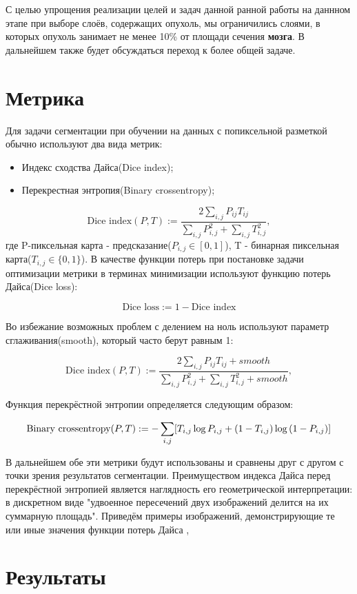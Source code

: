 С целью упрощения реализации целей и задач данной ранной работы на даннном этапе при выборе слоёв, содержащих опухоль, мы ограничились слоями, в которых опухоль занимает не менее 10\% от площади сечения {\bf мозга}. В дальнейшем также будет обсуждаться переход к более общей задаче.
\section{Метрика}

Для задачи сегментации при обучении на данных с попиксельной разметкой обычно используют два вида метрик:
\begin{itemize}
    \item Индекс сходства Дайса(Dice index);
    \item Перекрестная энтропия(Binary crossentropy);
\end{itemize}

$$\text{Dice~index}(P,T) := \frac{2\sum_{i,j}P_{ij}T_{ij}}{\sum_{i,j}P^2_{i,j} + \sum_{i,j}T^2_{i,j}},$$
где P-пиксельная карта - предсказание($P_{i,j}\in [0,1]$), T - бинарная пиксельная карта($T_{i,j}\in\{0,1\}$). В качестве функции потерь при постановке задачи оптимизации метрики в терминах минимизации используют функцию потерь Дайса(Dice loss):

$$\text{Dice~loss} := 1 - \text{Dice~index}$$

Во избежание возможных проблем с делением на ноль используют параметр сглаживания(smooth), который часто берут равным 1:

$$\text{Dice~index}(P,T) := \frac{2\sum_{i,j}P_{ij}T_{ij} + smooth}{\sum_{i,j}P^2_{i,j} + \sum_{i,j}T^2_{i,j} + smooth},$$

Функция перекрёстной энтропии определяется следующим образом:

$$\text{Binary~crossentropy}(P, T) := -\sum_{i,j}\Large[T_{i,j}\log{P_{i,j}} + (1-T_{i,j})\log{(1-P_{i,j})}\Large]$$

В дальнейшем обе эти метрики будут использованы и сравнены друг с другом с точки зрения результатов сегментации. Преимуществом индекса Дайса перед перекрёстной энтропией является наглядность его геометрической интерпретации: в дискретном виде "удвоенное пересечений двух изображений делится на их суммарную площадь". Приведём примеры изображений, демонстрирующие те или иные значения функции потерь Дайса , 


\section{Результаты}

